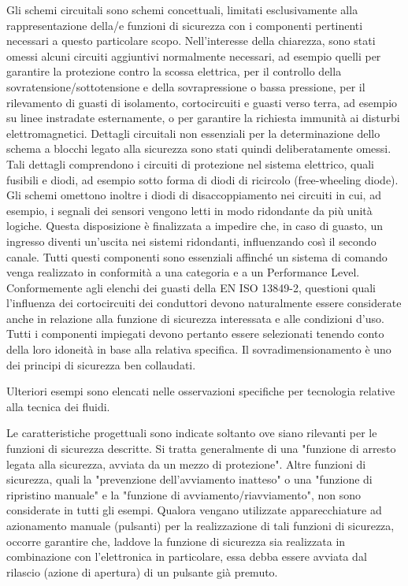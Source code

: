 Gli schemi circuitali sono schemi concettuali, limitati esclusivamente alla rappresentazione della/e funzioni di sicurezza con i componenti pertinenti necessari a questo particolare scopo. Nell'interesse della chiarezza, sono stati omessi alcuni circuiti aggiuntivi normalmente necessari, ad esempio quelli per garantire la protezione contro la scossa elettrica, per il controllo della sovratensione/sottotensione e della sovrapressione o bassa pressione, per il rilevamento di guasti di isolamento, cortocircuiti e guasti verso terra, ad esempio su linee instradate esternamente, o per garantire la richiesta immunità ai disturbi elettromagnetici. Dettagli circuitali non essenziali per la determinazione dello schema a blocchi legato alla sicurezza sono stati quindi deliberatamente omessi. Tali dettagli comprendono i circuiti di protezione nel sistema elettrico, quali fusibili e diodi, ad esempio sotto forma di diodi di ricircolo (free-wheeling diode). Gli schemi omettono inoltre i diodi di disaccoppiamento nei circuiti in cui, ad esempio, i segnali dei sensori vengono letti in modo ridondante da più unità logiche. Questa disposizione è finalizzata a impedire che, in caso di guasto, un ingresso diventi un'uscita nei sistemi ridondanti, influenzando così il secondo canale. Tutti questi componenti sono essenziali affinché un sistema di comando venga realizzato in conformità a una categoria e a un Performance Level. Conformemente agli elenchi dei guasti della EN ISO 13849-2, questioni quali l'influenza dei cortocircuiti dei conduttori devono naturalmente essere considerate anche in relazione alla funzione di sicurezza interessata e alle condizioni d'uso. Tutti i componenti impiegati devono pertanto essere selezionati tenendo conto della loro idoneità in base alla relativa specifica. Il sovradimensionamento è uno dei principi di sicurezza ben collaudati.

Ulteriori esempi sono elencati nelle osservazioni specifiche per tecnologia relative alla tecnica dei fluidi.

Le caratteristiche progettuali sono indicate soltanto ove siano rilevanti per le funzioni di sicurezza descritte. Si tratta generalmente di una "funzione di arresto legata alla sicurezza, avviata da un mezzo di protezione". Altre funzioni di sicurezza, quali la "prevenzione dell'avviamento inatteso" o una "funzione di ripristino manuale" e la "funzione di avviamento/riavviamento", non sono considerate in tutti gli esempi. Qualora vengano utilizzate apparecchiature ad azionamento manuale (pulsanti) per la realizzazione di tali funzioni di sicurezza, occorre garantire che, laddove la funzione di sicurezza sia realizzata in combinazione con l'elettronica in particolare, essa debba essere avviata dal rilascio (azione di apertura) di un pulsante già premuto.

